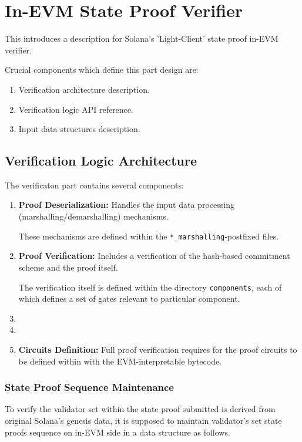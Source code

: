 \chapter{In-EVM State Proof Verifier}

This introduces a description for Solana's 'Light-Client' state proof in-EVM
verifier.

Crucial components which define this part design are:
\begin{enumerate}
    \item Verification architecture description.
    \item Verification logic API reference.
    \item Input data structures description.
\end{enumerate}

\section{Verification Logic Architecture}

The verificaton part contains several components:
\begin{enumerate}
    \item \textbf{Proof Deserialization:} Handles the input data processing (marshalling/demarshalling) mechanisms.

    These mechanisms are defined within the \texttt{*_marshalling}-postfixed files.

    \item \textbf{Proof Verification:} Includes a verification of the hash-based commitment scheme and the proof itself.

    The verification itself is defined within the directory \texttt{components}, each of which defines a set of gates
    relevant to particular component.

    \item \item \item \textbf{Circuits Definition:} Full proof verification requires for the proof circuits to be defined within
    with the EVM-interpretable bytecode.
\end{enumerate}

\subsection{State Proof Sequence Maintenance}
\label{subsec:stateseq}

To verify the validator set within the state proof submitted is derived from 
original Solana's genesis data, it is supposed to maintain validator's set state
proofs sequence on in-EVM side in a data structure as follows.

